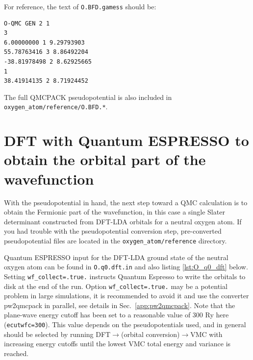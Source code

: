 For reference, the text of \texttt{O.BFD.gamess} should be:
\begin{lstlisting}
O-QMC GEN 2 1
3
6.00000000 1 9.29793903
55.78763416 3 8.86492204
-38.81978498 2 8.62925665
1
38.41914135 2 8.71924452

\end{lstlisting}
\noindent
The full QMCPACK pseudopotential is also included in \texttt{oxygen\_atom/reference/O.BFD.*}.


\section{DFT with Quantum ESPRESSO to obtain the orbital part of the wavefunction}
\label{sec:lqb_dft}
With the pseudopotential in hand, the next step toward a QMC calculation is to obtain the Fermionic part of the wavefunction, in this case a single Slater determinant constructed from DFT-LDA orbitals for a neutral oxygen atom.  If you had trouble with the pseudopotential conversion step, pre-converted pseudopotential files are located in the \texttt{oxygen\_atom/reference} directory.  

Quantum ESPRESSO input for the DFT-LDA ground state of the neutral oxygen atom can be found in \texttt{O.q0.dft.in} and also listing \ref{lst:O_q0_dft} below.  Setting \texttt{wf\_collect=.true.} instructs Quantum Espresso to write the orbitals to disk at the end of the run. Option \texttt{wf\_collect=.true.} may be a potential problem in large simulations, it is recommended to avoid it and use the converter pw2qmcpack in parallel, see details in Sec.~\ref{app:pw2qmcpack}. Note that the plane-wave energy cutoff has been set to a reasonable value of 300 Ry here (\texttt{ecutwfc=300}).  This value depends on the pseudopotentials used, and in general should be selected by running DFT$\rightarrow$(orbital conversion)$\rightarrow$VMC with increasing energy cutoffs until the lowest VMC total energy and variance is reached.

